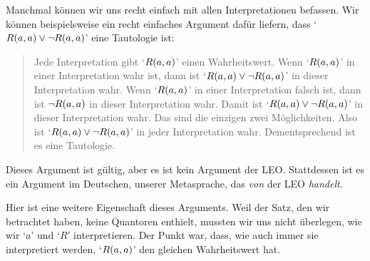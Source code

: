 Manchmal können wir uns recht einfach mit allen Interpretationen befassen. Wir können beispielsweise ein recht einfaches Argument dafür liefern, dass `$\mathord{R}(a,a)\vee\neg \mathord{R}(a,a)$' eine Tautologie ist:
	\begin{quote}
		\label{allmodels1}
		Jede Interpretation gibt `$\mathord{R}(a,a)$' einen Wahrheitswert. Wenn `$\mathord{R}(a,a)$' in einer Interpretation wahr ist, dann ist `$\mathord{R}(a,a) \vee \neg\mathord{R}(a,a)$' in dieser Interpretation wahr. Wenn `$\mathord{R}(a,a)$' in einer Interpretation falsch ist, dann ist $\neg\mathord{R}(a,a)$ in dieser Interpretation wahr. Damit ist `$\mathord{R}(a,a) \vee\neg \mathord{R}(a,a)$' in dieser Interpretation wahr. Das sind die einzigen zwei Möglichkeiten. Also ist `$\mathord{R}(a,a) \vee\neg \mathord{R}(a,a)$' in jeder Interpretation wahr. Dementsprechend ist es eine Tautologie.
	\end{quote}
Dieses Argument ist gültig, aber es ist kein Argument der LEO. Stattdessen ist es ein Argument im Deutschen, unserer Metasprache, das \emph{von} der LEO \emph{handelt}. 

Hier ist eine weitere Eigenschaft dieses Arguments. Weil der Satz, den wir betrachtet haben, keine Quantoren enthielt, mussten wir uns nicht überlegen, wie wir `$a$' und `$R$' interpretieren. Der Punkt war, dass, wie auch immer sie interpretiert werden, `$\mathord{R}(a,a)$' den gleichen Wahrheitswert hat.

